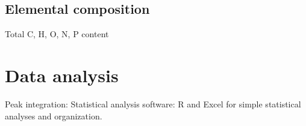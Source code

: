 \subsection{Elemental composition}
Total C, H, O, N, P content



\section{Data analysis}
Peak integration: 
Statistical analysis software: R and Excel for simple statistical analyses and organization. 

